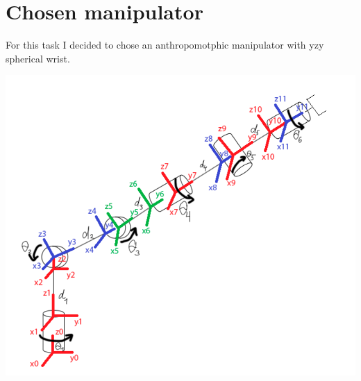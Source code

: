 \documentclass{article}
\begin{document}
    \section*{Chosen manipulator}

    For this task I decided to chose an anthropomotphic manipulator with yzy spherical wrist.

    \includegraphics[width=\linewidth]{manipulator_scheme}

    

    \newpage
    
    

    \newpage

    
\end{document}

